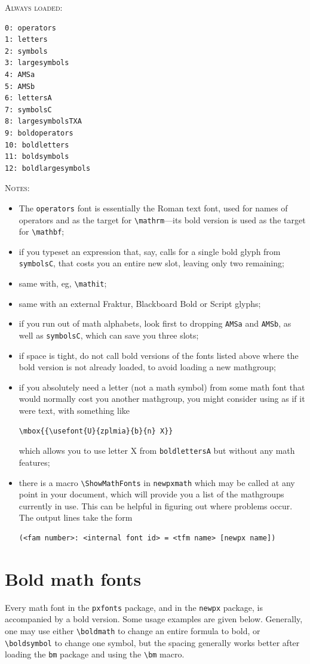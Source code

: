 \documentclass[11pt]{article}
\theoremstyle{oldplain}
\theoremstyle{plain}
\begin{document}
\textsc{Always loaded:}
\begin{verbatim}
0: operators
1: letters
2: symbols
3: largesymbols
4: AMSa
5: AMSb
6: lettersA
7: symbolsC
8: largesymbolsTXA
9: boldoperators
10: boldletters
11: boldsymbols
12: boldlargesymbols
\end{verbatim}
\textsc{Notes:}
\begin{itemize}
\item
The {\tt operators} font is essentially the Roman text font, used for names of operators and as the target for \verb|\mathrm|---its bold version is used as the target for \verb|\mathbf|;
\item if you typeset an expression that, say, calls for a single bold glyph from  {\tt symbolsC}, that costs you an entire new slot, leaving only two remaining;
\item same with, eg, \verb|\mathit|;
\item same with an external Fraktur, Blackboard Bold or Script glyphs;
\item if you run out of math alphabets, look first to dropping {\tt AMSa} and {\tt AMSb}, as well as {\tt symbolsC}, which can save you three slots;
\item if space is tight, do not call bold versions of the fonts listed above where the bold version is not already loaded, to avoid loading a new mathgroup; 
\item if you absolutely need a letter (not a math symbol) from some math font that would normally cost you another mathgroup, you might consider using as if it were text, with something like
\begin{verbatim}
\mbox{{\usefont{U}{zplmia}{b}{n} X}}
\end{verbatim}
which allows you to use letter X from {\tt boldlettersA} but without any math features;
\item there is a macro \verb|\ShowMathFonts| in {\tt newpxmath} which may be called at any point in your document, which will provide you a list of the mathgroups currently in use. This can be helpful in figuring out where problems occur. The output lines take the form
\begin{verbatim}
(<fam number>: <internal font id> = <tfm name> [newpx name])
\end{verbatim}

\end{itemize}
\section{Bold math fonts}\label{sec:boldmath}
Every math font in the {\tt pxfonts} package, and in the {\tt newpx} package, is accompanied by a bold version. Some usage examples are given below. Generally, one may use either \verb|\boldmath| to change an entire formula to bold, or \verb|\boldsymbol| to change one symbol, but the spacing generally works better after loading the {\tt bm} package and using the \verb|\bm| macro.
\end{document}
